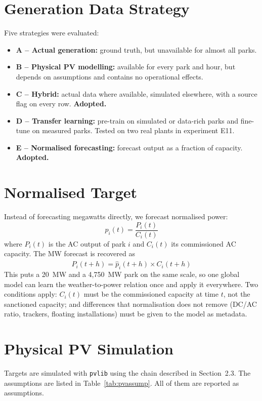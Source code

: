 \documentclass[12pt]{report}
\begin{document}
\section{Generation Data Strategy}
\vspace{1mm}
Five strategies were evaluated:
\begin{itemize}[noitemsep]
    \item \textbf{A -- Actual generation:} ground truth, but unavailable for almost all parks.
    \item \textbf{B -- Physical PV modelling:} available for every park and hour, but depends on assumptions and contains no operational effects.
    \item \textbf{C -- Hybrid:} actual data where available, simulated elsewhere, with a source flag on every row. \textbf{Adopted.}
    \item \textbf{D -- Transfer learning:} pre-train on simulated or data-rich parks and fine-tune on measured parks. Tested on two real plants in experiment E11.
    \item \textbf{E -- Normalised forecasting:} forecast output as a fraction of capacity. \textbf{Adopted.}
\end{itemize}

\section{Normalised Target}
\vspace{1mm}
Instead of forecasting megawatts directly, we forecast normalised power:
\begin{equation}
    p_i(t) = \frac{P_i(t)}{C_i(t)}
\end{equation}
where $P_i(t)$ is the AC output of park $i$ and $C_i(t)$ its commissioned AC capacity. The MW forecast is recovered as
\begin{equation}
    \hat{P}_i(t+h) = \hat{p}_i(t+h) \times C_i(t+h)
\end{equation}
This puts a 20~MW and a 4,750~MW park on the same scale, so one global model can learn the weather-to-power relation once and apply it everywhere. Two conditions apply: $C_i(t)$ must be the commissioned capacity at time $t$, not the sanctioned capacity; and differences that normalisation does not remove (DC/AC ratio, trackers, floating installations) must be given to the model as metadata.

\section{Physical PV Simulation}
\vspace{1mm}
Targets are simulated with \texttt{pvlib} \cite{pvlib} using the chain described in Section~2.3. The assumptions are listed in Table~\ref{tab:pvassump}. All of them are reported as assumptions.
\end{document}
